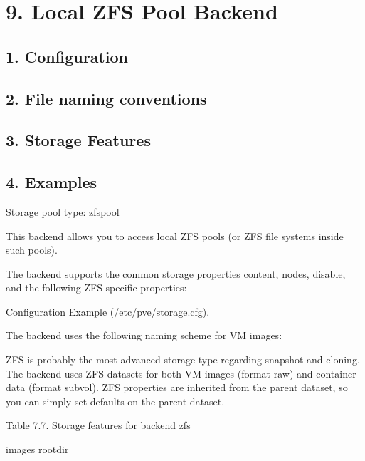 \begin{table}[htbp]

\centering

\begin{tabular}

\end{tabular}

\end{table}


\section{9. Local ZFS Pool Backend}

\subsection{1. Configuration}

\subsection{2. File naming conventions}

\subsection{3. Storage Features}

\subsection{4. Examples}

Storage pool type: zfspool

This backend allows you to access local ZFS pools (or ZFS file systems inside such pools).

The backend supports the common storage properties content, nodes, disable, and the following ZFS specific properties:

Configuration Example (/etc/pve/storage.cfg).

The backend uses the following naming scheme for VM images:

ZFS is probably the most advanced storage type regarding snapshot and cloning. The backend uses ZFS datasets for both VM images (format raw) and container data (format subvol). ZFS properties are inherited from the parent dataset, so you can simply set defaults on the parent dataset.

Table 7.7. Storage features for backend zfs

images rootdir

